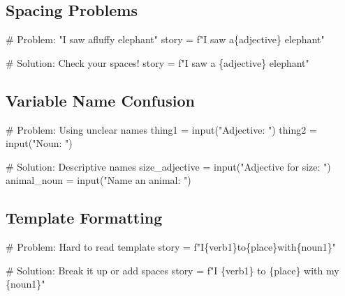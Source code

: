 \documentclass[
  letterpaper,
  DIV=11,
  numbers=noendperiod,
  oneside]{scrreprt}
\newenvironment{Shaded}{}{}
\newcommand{\BuiltInTok}[1]{\textcolor[rgb]{0.84,0.23,0.29}{#1}}
\newcommand{\CommentTok}[1]{\textcolor[rgb]{0.42,0.45,0.49}{#1}}
\newcommand{\NormalTok}[1]{\textcolor[rgb]{0.14,0.16,0.18}{#1}}
\newcommand{\OperatorTok}[1]{\textcolor[rgb]{0.14,0.16,0.18}{#1}}
\newcommand{\SpecialCharTok}[1]{\textcolor[rgb]{0.00,0.36,0.77}{#1}}
\newcommand{\SpecialStringTok}[1]{\textcolor[rgb]{0.01,0.18,0.38}{#1}}
\newcommand{\StringTok}[1]{\textcolor[rgb]{0.01,0.18,0.38}{#1}}
\begin{document}
\subsection{Spacing Problems}\label{spacing-problems}

\begin{Shaded}
\begin{Highlighting}[]
\CommentTok{\# Problem: "I saw afluffy elephant"}
\NormalTok{story }\OperatorTok{=} \SpecialStringTok{f"I saw a}\SpecialCharTok{\{}\NormalTok{adjective}\SpecialCharTok{\}}\SpecialStringTok{ elephant"}

\CommentTok{\# Solution: Check your spaces!}
\NormalTok{story }\OperatorTok{=} \SpecialStringTok{f"I saw a }\SpecialCharTok{\{}\NormalTok{adjective}\SpecialCharTok{\}}\SpecialStringTok{ elephant"}
\end{Highlighting}
\end{Shaded}

\subsection{Variable Name Confusion}\label{variable-name-confusion}

\begin{Shaded}
\begin{Highlighting}[]
\CommentTok{\# Problem: Using unclear names}
\NormalTok{thing1 }\OperatorTok{=} \BuiltInTok{input}\NormalTok{(}\StringTok{"Adjective: "}\NormalTok{)}
\NormalTok{thing2 }\OperatorTok{=} \BuiltInTok{input}\NormalTok{(}\StringTok{"Noun: "}\NormalTok{)}

\CommentTok{\# Solution: Descriptive names}
\NormalTok{size\_adjective }\OperatorTok{=} \BuiltInTok{input}\NormalTok{(}\StringTok{"Adjective for size: "}\NormalTok{)}
\NormalTok{animal\_noun }\OperatorTok{=} \BuiltInTok{input}\NormalTok{(}\StringTok{"Name an animal: "}\NormalTok{)}
\end{Highlighting}
\end{Shaded}

\subsection{Template Formatting}\label{template-formatting}

\begin{Shaded}
\begin{Highlighting}[]
\CommentTok{\# Problem: Hard to read template}
\NormalTok{story }\OperatorTok{=} \SpecialStringTok{f"I}\SpecialCharTok{\{}\NormalTok{verb1}\SpecialCharTok{\}}\SpecialStringTok{to}\SpecialCharTok{\{}\NormalTok{place}\SpecialCharTok{\}}\SpecialStringTok{with}\SpecialCharTok{\{}\NormalTok{noun1}\SpecialCharTok{\}}\SpecialStringTok{"}

\CommentTok{\# Solution: Break it up or add spaces}
\NormalTok{story }\OperatorTok{=} \SpecialStringTok{f"I }\SpecialCharTok{\{}\NormalTok{verb1}\SpecialCharTok{\}}\SpecialStringTok{ to }\SpecialCharTok{\{}\NormalTok{place}\SpecialCharTok{\}}\SpecialStringTok{ with my }\SpecialCharTok{\{}\NormalTok{noun1}\SpecialCharTok{\}}\SpecialStringTok{"}
\end{Highlighting}
\end{Shaded}
\end{document}
